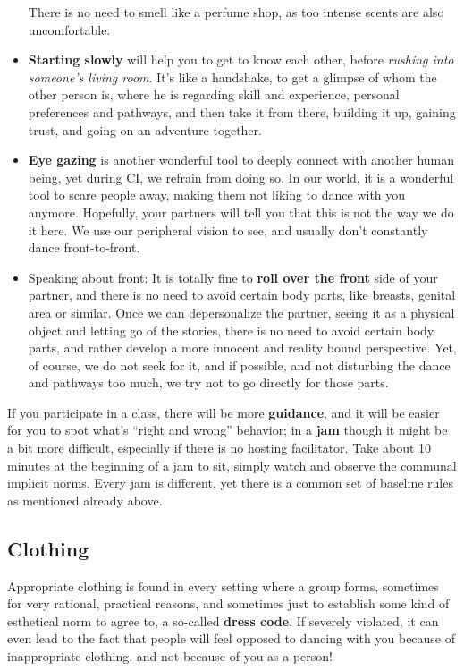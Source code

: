 \begin{itemize}
    There is no need to smell like a perfume shop, as too intense scents are also uncomfortable.
    \item \textbf{Starting slowly} will help you to get to know each other, before \textit{rushing into someone's living room}.
    It's like a handshake, to get a glimpse of whom the other person is, where he is regarding skill and experience, personal preferences and pathways, and then take it from there, building it up, gaining trust, and going on an adventure together.
    \item \textbf{Eye gazing} is another wonderful tool to deeply connect with another human being, yet during CI, we refrain from doing so.
    In our world, it is a wonderful tool to scare people away, making them not liking to dance with you anymore.
    Hopefully, your partners will tell you that this is not the way we do it here.
    We use our peripheral vision to see, and usually don't constantly dance front-to-front.
    \item Speaking about front: It is totally fine to \textbf{roll over the front} side of your partner, and there is no need to avoid certain body parts, like breasts, genital area or similar.
    Once we can depersonalize the partner, seeing it as a physical object and letting go of the stories, there is no need to avoid certain body parts, and rather develop a more innocent and reality bound perspective.
    Yet, of course, we do not seek for it, and if possible, and not disturbing the dance and pathways too much, we try not to go directly for those parts.
\end{itemize}

If you participate in a class, there will be more \textbf{guidance}, and it will be easier for you to spot what's ``right and wrong'' behavior; in a \textbf{jam} though it might be a bit more difficult, especially if there is no hosting facilitator.
Take about 10 minutes at the beginning of a jam to sit, simply watch and observe the communal implicit norms.
Every jam is different, yet there is a common set of baseline rules as mentioned already above.

\subsection{Clothing}\label{subsec:clothing}

Appropriate clothing is found in every setting where a group forms, sometimes for very rational, practical reasons, and sometimes just to establish some kind of esthetical norm to agree to, a so-called \textbf{dress code}.
If severely violated, it can even lead to the fact that people will feel opposed to dancing with you because of inappropriate clothing, and not because of you as a person!


